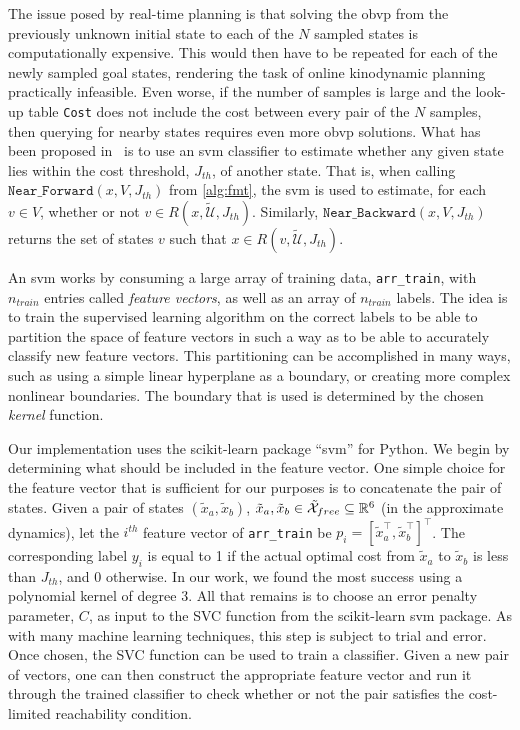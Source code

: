 The issue posed by real-time planning is that solving the \gls{obvp} from the previously unknown initial state to each of the $N$ sampled states is computationally expensive. This would then have to be repeated for each of the newly sampled goal states, rendering the task of online kinodynamic planning practically infeasible. Even worse, if the number of samples is large and the look-up table \texttt{Cost} does not include the cost between every pair of the $N$ samples, then querying for nearby states requires even more \gls{obvp} solutions. What has been proposed in~\cite{Allen2016} is to use an \gls{svm} classifier to estimate whether any given state lies within the cost threshold, $J_{th}$, of another state. That is, when calling $\texttt{Near\_Forward}(x,V,J_{th})$ from \autoref{alg:fmt}, the \gls{svm} is used to estimate, for each $v \in V$, whether or not $v \in R(x, \mathcal{\tilde{U}}, J_{th})$. Similarly, $\texttt{Near\_Backward}(x,V,J_{th})$ returns the set of states $v$ such that $x \in R(v, \mathcal{\tilde{U}}, J_{th})$.

An \gls{svm} works by consuming a large array of training data, \texttt{arr\_train}, with $n_{train}$ entries called \emph{feature vectors}, as well as an array of $n_{train}$ labels. The idea is to train the supervised learning algorithm on the correct labels to be able to partition the space of feature vectors in such a way as to be able to accurately classify new feature vectors. This partitioning can be accomplished in many ways, such as using a simple linear hyperplane as a boundary, or creating more complex nonlinear boundaries. The boundary that is used is determined by the chosen \emph{kernel} function.

Our implementation uses the scikit-learn package ``svm'' for Python. We begin by determining what should be included in the feature vector. One simple choice for the feature vector that is sufficient for our purposes is to concatenate the pair of states. Given a pair of states $(\tilde{x}_a, \tilde{x}_b)$, $\tilde{x}_a, \tilde{x}_b \in \mathcal{\tilde{X}}_{free} \subseteq \mathbb{R}^6$ (in the approximate dynamics), let the $i^{th}$ feature vector of \texttt{arr\_train} be $p_i = {[\tilde{x}_a^\top, \tilde{x}_b^\top]}^\top$. The corresponding label $y_i$ is equal to 1 if the actual optimal cost from $\tilde{x}_a$ to $\tilde{x}_b$ is less than $J_{th}$, and 0 otherwise. In our work, we found the most success using a polynomial kernel of degree 3. All that remains is to choose an error penalty parameter, $C$, as input to the SVC function from the scikit-learn svm package. As with many machine learning techniques, this step is subject to trial and error. Once chosen, the SVC function can be used to train a classifier. Given a new pair of vectors, one can then construct the appropriate feature vector and run it through the trained classifier to check whether or not the pair satisfies the cost-limited reachability condition.

